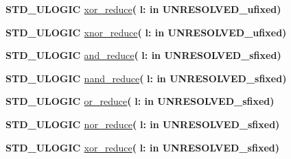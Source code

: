 \begin{DoxyCompactItemize}
\item 
{\bfseries {\bfseries \textcolor{comment}{S\+T\+D\+\_\+\+U\+L\+O\+G\+I\+C}\textcolor{vhdlchar}{ }}} \hyperlink{classfixed__pkg_a89bc2be1fa542184cf07e7c65187b945}{xor\+\_\+reduce}{\bfseries  ( }{\bfseries \textcolor{vhdlchar}{l\+: }\textcolor{stringliteral}{in }\textcolor{vhdlchar}{U\+N\+R\+E\+S\+O\+L\+V\+E\+D\+\_\+ufixed}}{\bfseries  )} 
\item 
{\bfseries {\bfseries \textcolor{comment}{S\+T\+D\+\_\+\+U\+L\+O\+G\+I\+C}\textcolor{vhdlchar}{ }}} \hyperlink{classfixed__pkg_ab6ceee79204a420850ad9e7876dc0ec4}{xnor\+\_\+reduce}{\bfseries  ( }{\bfseries \textcolor{vhdlchar}{l\+: }\textcolor{stringliteral}{in }\textcolor{vhdlchar}{U\+N\+R\+E\+S\+O\+L\+V\+E\+D\+\_\+ufixed}}{\bfseries  )} 
\item 
{\bfseries {\bfseries \textcolor{comment}{S\+T\+D\+\_\+\+U\+L\+O\+G\+I\+C}\textcolor{vhdlchar}{ }}} \hyperlink{classfixed__pkg_ab127ad18d0e5b9a38b09dfeeb23f2809}{and\+\_\+reduce}{\bfseries  ( }{\bfseries \textcolor{vhdlchar}{l\+: }\textcolor{stringliteral}{in }\textcolor{vhdlchar}{U\+N\+R\+E\+S\+O\+L\+V\+E\+D\+\_\+sfixed}}{\bfseries  )} 
\item 
{\bfseries {\bfseries \textcolor{comment}{S\+T\+D\+\_\+\+U\+L\+O\+G\+I\+C}\textcolor{vhdlchar}{ }}} \hyperlink{classfixed__pkg_adce82fa7ec9d1f061f5d6b3dc67d583d}{nand\+\_\+reduce}{\bfseries  ( }{\bfseries \textcolor{vhdlchar}{l\+: }\textcolor{stringliteral}{in }\textcolor{vhdlchar}{U\+N\+R\+E\+S\+O\+L\+V\+E\+D\+\_\+sfixed}}{\bfseries  )} 
\item 
{\bfseries {\bfseries \textcolor{comment}{S\+T\+D\+\_\+\+U\+L\+O\+G\+I\+C}\textcolor{vhdlchar}{ }}} \hyperlink{classfixed__pkg_adee70e282d92bddd3959ca7436fdfb87}{or\+\_\+reduce}{\bfseries  ( }{\bfseries \textcolor{vhdlchar}{l\+: }\textcolor{stringliteral}{in }\textcolor{vhdlchar}{U\+N\+R\+E\+S\+O\+L\+V\+E\+D\+\_\+sfixed}}{\bfseries  )} 
\item 
{\bfseries {\bfseries \textcolor{comment}{S\+T\+D\+\_\+\+U\+L\+O\+G\+I\+C}\textcolor{vhdlchar}{ }}} \hyperlink{classfixed__pkg_a807bcfdd90aa99257feb3c93cb068e79}{nor\+\_\+reduce}{\bfseries  ( }{\bfseries \textcolor{vhdlchar}{l\+: }\textcolor{stringliteral}{in }\textcolor{vhdlchar}{U\+N\+R\+E\+S\+O\+L\+V\+E\+D\+\_\+sfixed}}{\bfseries  )} 
\item 
{\bfseries {\bfseries \textcolor{comment}{S\+T\+D\+\_\+\+U\+L\+O\+G\+I\+C}\textcolor{vhdlchar}{ }}} \hyperlink{classfixed__pkg_a89bc2be1fa542184cf07e7c65187b945}{xor\+\_\+reduce}{\bfseries  ( }{\bfseries \textcolor{vhdlchar}{l\+: }\textcolor{stringliteral}{in }\textcolor{vhdlchar}{U\+N\+R\+E\+S\+O\+L\+V\+E\+D\+\_\+sfixed}}{\bfseries  )} 

\end{DoxyCompactItemize}
